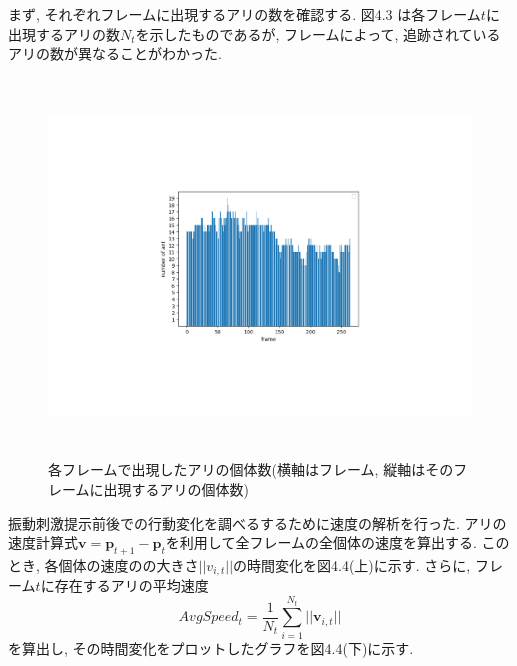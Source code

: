 ﻿\documentclass[a4paper, 12pt]{jsreport}
\begin{document}
まず, それぞれフレームに出現するアリの数を確認する. 図4.3 は各フレーム$t$に出現するアリの数$N_t$を示したものであるが, フレームによって, 追跡されているアリの数が異なることがわかった.
\begin{figure}[tbp]
\centering
\includegraphics[width=13cm,height = 10cm,  keepaspectratio]{appear.pdf}
\caption[Short figure caption for List of Figures]{各フレームで出現したアリの個体数(横軸はフレーム, 縦軸はそのフレームに出現するアリの個体数)}
\label{fig:paper1_fig10}
\end{figure}
振動刺激提示前後での行動変化を調べるするために速度の解析を行った. アリの速度計算式$\bm{v} = \bm{p}_{t + 1} - \bm{p}_t$を利用して全フレームの全個体の速度を算出する. このとき, 各個体の速度のの大きさ$||v_{i,t}||$の時間変化を図4.4(上)に示す. さらに, フレーム$t$に存在するアリの平均速度$$AvgSpeed_t =\frac{1}{N_t}\sum^{N_t}_{i=1}||\bm{v}_{i,t}|| $$を算出し, その時間変化をプロットしたグラフを図4.4(下)に示す. 
\end{document}
